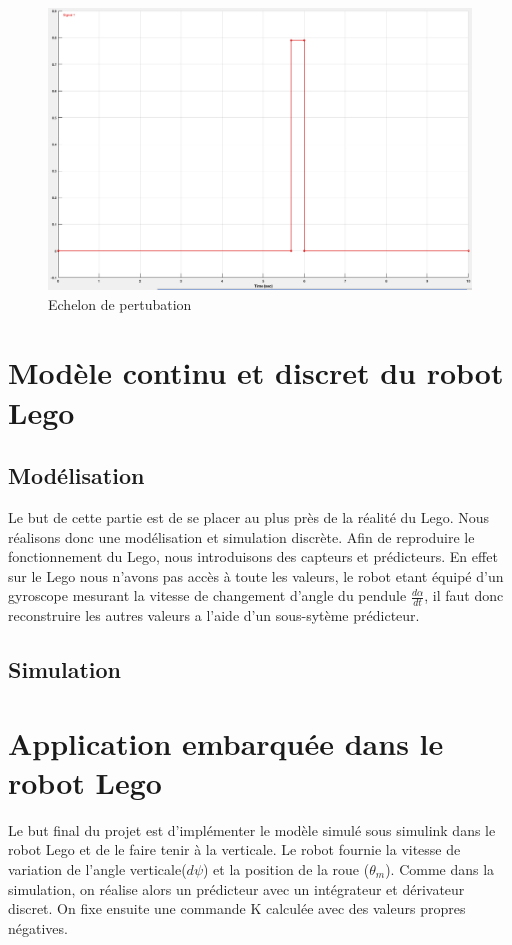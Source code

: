 \documentclass[11pt]{article}
\begin{document}
\begin{figure}[h!]
	\includegraphics[scale=0.2]{images/pendule_inverse_perturbation}
	\caption{Echelon de pertubation}
\end{figure}
\section{Modèle continu et discret du robot Lego}
\subsection{Modélisation}
Le but de cette partie est de se placer au plus près de la réalité du Lego. Nous réalisons donc une modélisation et simulation discrète. Afin de reproduire le fonctionnement du Lego, nous introduisons des capteurs et prédicteurs. En effet sur le Lego nous n'avons pas accès à toute les valeurs, le robot etant équipé d'un gyroscope mesurant la vitesse de changement d'angle du pendule $\frac{d\alpha}{dt}$, il faut donc reconstruire les autres valeurs a l'aide d'un sous-sytème prédicteur.
\subsection{Simulation}

\section{Application embarquée dans le robot Lego}

Le but final du projet est d'implémenter le modèle simulé sous simulink dans le robot Lego et de le faire tenir à la verticale. Le robot fournie la vitesse de variation de l'angle verticale($d\psi$) et la position de la roue ($\theta_m$). Comme dans la simulation, on réalise alors un prédicteur avec un intégrateur et dérivateur discret. On fixe ensuite une commande K calculée avec des valeurs propres négatives.
\end{document}

